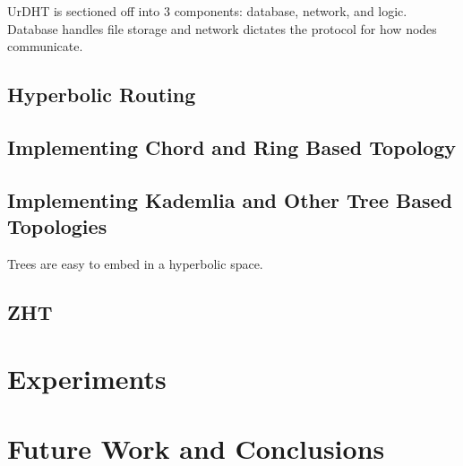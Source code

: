 \documentclass[11pt,conference]{IEEEtran}
\begin{document}
	UrDHT is sectioned off into 3 components: database, network, and logic.
	Database handles file storage and network dictates the protocol for how nodes communicate.

	
	\subsection{Hyperbolic Routing}
	\label{sec:hyper}
	
	\subsection{Implementing Chord and Ring Based Topology}
	
	
	\subsection{Implementing Kademlia and Other Tree Based Topologies}
	Trees are easy to embed in a hyperbolic space.
	\subsection{ZHT}
	
\section{Experiments}
\label{sec:experiments}

\section{Future Work and Conclusions}
\label{sec:future}



\end{document}
